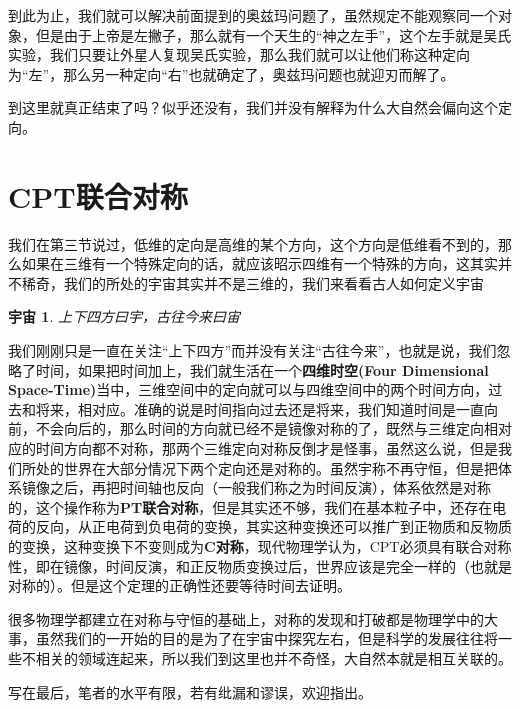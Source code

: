 \documentclass[hyperref,UTF8]{ctexart}
\newtheorem*{yuzhou}{宇宙}
\begin{document}
到此为止，我们就可以解决前面提到的奥兹玛问题了，虽然规定不能观察同一个对象，但是由于上帝是左撇子，那么就有一个天生的“神之左手”，这个左手就是吴氏实验，我们只要让外星人复现吴氏实验，那么我们就可以让他们称这种定向为“左”，那么另一种定向“右”也就确定了，奥兹玛问题也就迎刃而解了。

到这里就真正结束了吗？似乎还没有，我们并没有解释为什么大自然会偏向这个定向。
\section{CPT联合对称}
我们在第三节说过，低维的定向是高维的某个方向，这个方向是低维看不到的，那么如果在三维有一个特殊定向的话，就应该昭示四维有一个特殊的方向，这其实并不稀奇，我们的所处的宇宙其实并不是三维的，我们来看看古人如何定义宇宙
\begin{yuzhou}
    上下四方曰宇，古往今来曰宙
\end{yuzhou}
我们刚刚只是一直在关注“上下四方”而并没有关注“古往今来”，也就是说，我们忽略了时间，如果把时间加上，我们就生活在一个\textbf{四维时空(Four Dimensional Space-Time)}当中，三维空间中的定向就可以与四维空间中的两个时间方向，过去和将来，相对应。准确的说是时间指向过去还是将来，我们知道时间是一直向前，不会向后的，那么时间的方向就已经不是镜像对称的了，既然与三维定向相对应的时间方向都不对称，那两个三维定向对称反倒才是怪事，虽然这么说，但是我们所处的世界在大部分情况下两个定向还是对称的。虽然宇称不再守恒，但是把体系镜像之后，再把时间轴也反向（一般我们称之为时间反演），体系依然是对称的，这个操作称为\textbf{PT联合对称}，但是其实还不够，我们在基本粒子中，还存在电荷的反向，从正电荷到负电荷的变换，其实这种变换还可以推广到正物质和反物质的变换，这种变换下不变则成为\textbf{C对称}，现代物理学认为，CPT必须具有联合对称性，即在镜像，时间反演，和正反物质变换过后，世界应该是完全一样的（也就是对称的）。但是这个定理的正确性还要等待时间去证明。

很多物理学都建立在对称与守恒的基础上，对称的发现和打破都是物理学中的大事，虽然我们的一开始的目的是为了在宇宙中探究左右，但是科学的发展往往将一些不相关的领域连起来，所以我们到这里也并不奇怪，大自然本就是相互关联的。

写在最后，笔者的水平有限，若有纰漏和谬误，欢迎指出。
\end{document}
